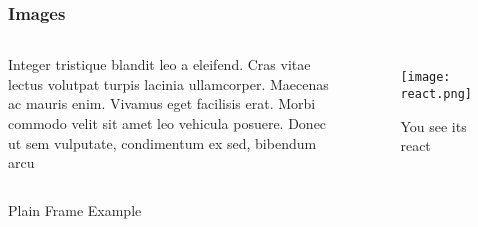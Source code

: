 \documentclass{beamer}
\begin{document}
\begin{frame}
\frametitle{Images}
\begin{columns}
Integer tristique blandit leo a eleifend. Cras vitae lectus volutpat turpis lacinia ullamcorper. Maecenas ac mauris enim. Vivamus eget facilisis erat. Morbi commodo velit sit amet leo vehicula posuere. Donec ut sem vulputate, condimentum ex sed, bibendum arcu
\begin{figure}[h]
\caption{You see its react}
\centering
\texttt{[image: react.png]} 
\end{figure}
\end{columns}
\end{frame}


\begin{frame}[plain]{}
\centering
\Huge Plain Frame Example 
\end{frame}
\end{document}
